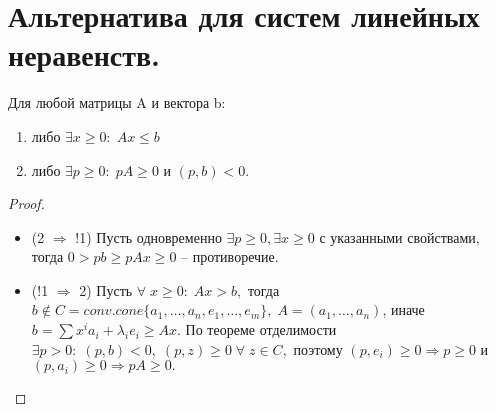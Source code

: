 \chapter{Альтернатива для систем линейных неравенств.}\label{cha:14}

\begin{theorem}
	Для любой матрицы A и вектора b:
	\begin{enumerate}
		\item либо $\exists x \geq 0: \; Ax \leq b$
		\item либо $\exists p \geq 0: \; pA \geq 0$ и $(p, b) < 0.$ 
	\end{enumerate}
\end{theorem}

\begin{proof}
	\begin{itemize}
		\item (2 $\Rightarrow$ !1) Пусть одновременно $\exists p \geq 0, \exists x \geq 0$ с указанными свойствами, тогда $0 > pb \geq pAx \geq 0$ -- противоречие.
		\item (!1 $\Rightarrow$ 2) Пусть $\forall \; x \geq 0: \; Ax > b,$ тогда $b \notin C = conv.cone\{ a_1, \ldots, a_n,  e_1, \ldots, e_m\}, \; A = (a_1, \ldots, a_n)$, иначе $b = \sum x^ia_i + \lambda_i e_i \geq Ax.$ По теореме отделимости $\exists p>0: \; (p, b) < 0, \; (p, z) \geq 0 \; \forall \; z \in C,$ поэтому $(p, e_i) \geq 0 \Rightarrow p \geq 0$ и $(p, a_i) \geq 0 \Rightarrow pA \geq 0.$
	\end{itemize}
\end{proof}
